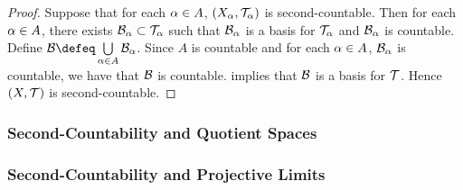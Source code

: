 \documentclass{book}
\begin{document}
	\begin{proof}
		Suppose that for each $\alpha \in A$, $(X_{\alpha}, \mathcal{T}_{\alpha})$ is second-countable. Then for each $\alpha \in A$, there exists $\mathcal{B}_{\alpha} \subset \mathcal{T}_{\alpha}$ such that $\mathcal{B}_{\alpha}$ is a basis for $\mathcal{T}_{\alpha}$ and $\mathcal{B}_{\alpha}$ is countable. Define $\MB \defeq \bigcup\limits_{\al \in A} \MB_{\al}$. Since $A$ is countable and for each $\alpha \in A$, $\mathcal{B}_{\alpha}$ is countable, we have that $\mathcal{B}$ is countable.  implies that $\mathcal{B}$ is a basis for $\mathcal{T}$. Hence $(X, \mathcal{T})$ is second-countable. 
	\end{proof}










































	\subsubsection{Second-Countability and Quotient Spaces}


























\subsubsection{Second-Countability and Projective Limits}

	
\end{document}
